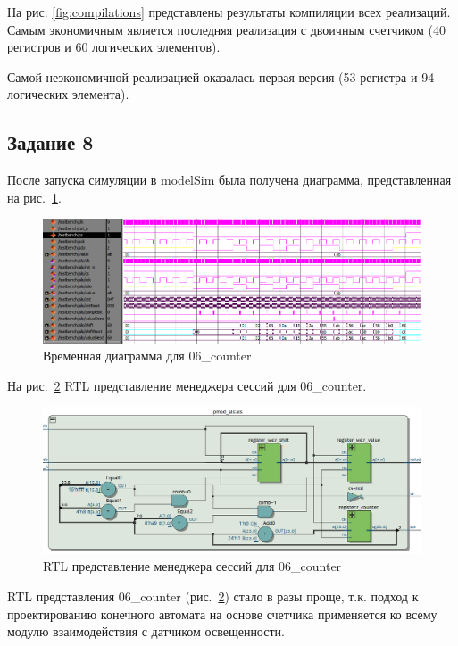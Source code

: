 \documentclass[a4paper,14pt]{article}
\begin{document}
	На рис. \ref{fig:compilations} представлены результаты компиляции всех реализаций. Самым экономичным является  последняя реализация с двоичным счетчиком (40 регистров и 60 логических элементов).
	
	Самой неэкономичной реализацией оказалась первая версия (53 регистра и 94 логических элемента).  
	
	
	\subsection{Задание 8}
	
	После запуска симуляции в modelSim была получена диаграмма, представленная на рис.~\ref{fig:z8msimwvf}.
	
	\begin{figure}[H]
		\centering
		\includegraphics[width=0.9\linewidth]{images/z9}
		\caption{Временная диаграмма для 06\_counter}
		\label{fig:z8msimwvf}
	\end{figure}
	
	На рис.~\ref{fig:z8rtl} RTL представление менеджера сессий для 06\_counter.
	
	\begin{figure}[H]
		\centering
		\includegraphics[width=0.9\linewidth]{images/z8_rtl}
		\caption{RTL представление менеджера сессий для 06\_counter}
		\label{fig:z8rtl}
	\end{figure}
		
	RTL представления 06\_counter (рис.~\ref{fig:z8rtl}) стало в разы проще, т.к. подход к проектированию конечного автомата на основе счетчика	применяется ко всему модулю взаимодействия с датчиком освещенности.
	
\end{document}
